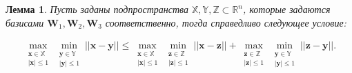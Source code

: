 \documentclass[12pt, twoside]{article}
\newtheorem{lemma}[theorem]{Лемма}
\numberwithin{equation}{section}
\begin{document}
\begin{lemma} \label{lem:2} 
Пусть заданы подпространства $\mathbb{X}, \mathbb{Y}, \mathbb{Z} \subset \mathbb{R}^{n}$, которые задаются базисами $\textbf{W}_1, \textbf{W}_2, \textbf{W}_3$ соответственно, тогда справедливо следующее условие:

\begin{equation}
\label{eq:l2:1}
\begin{aligned}
\max_{\substack{\textbf{x} \in \mathbb{X} \\ \left|\textbf{x}\right|\leq 1}}\min_{\substack{\textbf{y} \in \mathbb{Y} \\ \left|\textbf{y}\right|\leq 1}}||\textbf{x}-\textbf{y}||\leq 
\max_{\substack{\textbf{x} \in \mathbb{X} \\ \left|\textbf{x}\right|\leq 1}}\min_{\substack{\textbf{z} \in \mathbb{Z} \\ \left|\textbf{z}\right|\leq 1}}||\textbf{x}-\textbf{z}|| + 
\max_{\substack{\textbf{z} \in \mathbb{Z} \\ \left|\textbf{z}\right|\leq 1}}\min_{\substack{\textbf{y} \in \mathbb{Y} \\ \left|\textbf{y}\right|\leq 1}}||\textbf{z}-\textbf{y}||.
\end{aligned}
\end{equation}
\end{lemma}
\end{document}
